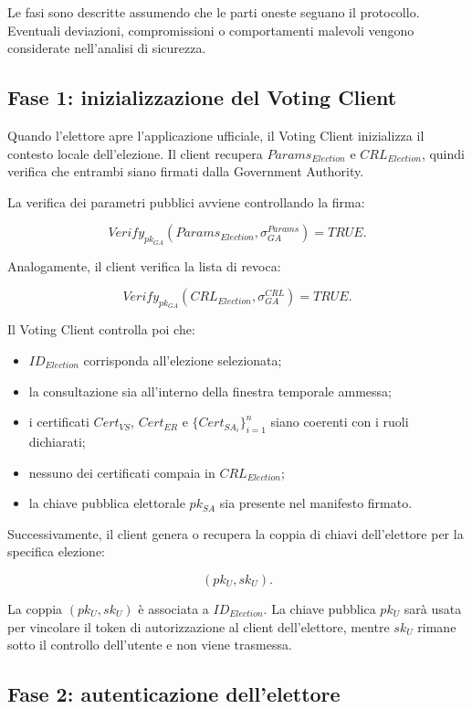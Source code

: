 \documentclass[a4paper,12pt]{article}
\begin{document}
Le fasi sono descritte assumendo che le parti oneste seguano il protocollo. 
Eventuali deviazioni, compromissioni o comportamenti malevoli vengono considerate nell'analisi di sicurezza.

\subsection{Fase 1: inizializzazione del Voting Client}

Quando l'elettore apre l'applicazione ufficiale, il Voting Client inizializza il contesto locale dell'elezione. 
Il client recupera \(Params_{Election}\) e \(CRL_{Election}\), quindi verifica che entrambi siano firmati dalla Government Authority.

La verifica dei parametri pubblici avviene controllando la firma:

\[
	Verify_{pk_{GA}}(Params_{Election}, \sigma_{GA}^{Params}) = TRUE.
\]

Analogamente, il client verifica la lista di revoca:

\[
	Verify_{pk_{GA}}(CRL_{Election}, \sigma_{GA}^{CRL}) = TRUE.
\]

Il Voting Client controlla poi che:

\begin{itemize}
	\item \(ID_{Election}\) corrisponda all'elezione selezionata;
	\item la consultazione sia all'interno della finestra temporale ammessa;
	\item i certificati \(Cert_{VS}\), \(Cert_{ER}\) e \(\{Cert_{SA_i}\}_{i=1}^{n}\) siano coerenti con i ruoli dichiarati;
	\item nessuno dei certificati compaia in \(CRL_{Election}\);
	\item la chiave pubblica elettorale \(pk_{SA}\) sia presente nel manifesto firmato.
\end{itemize}

Successivamente, il client genera o recupera la coppia di chiavi dell'elettore per la specifica elezione:

\[
	(pk_U, sk_U).
\]

La coppia \((pk_U, sk_U)\) \`e associata a \(ID_{Election}\). 
La chiave pubblica \(pk_U\) sar\`a usata per vincolare il token di autorizzazione al client dell'elettore, mentre \(sk_U\) rimane sotto il controllo dell'utente e non viene trasmessa.

\subsection{Fase 2: autenticazione dell'elettore}
\end{document}

